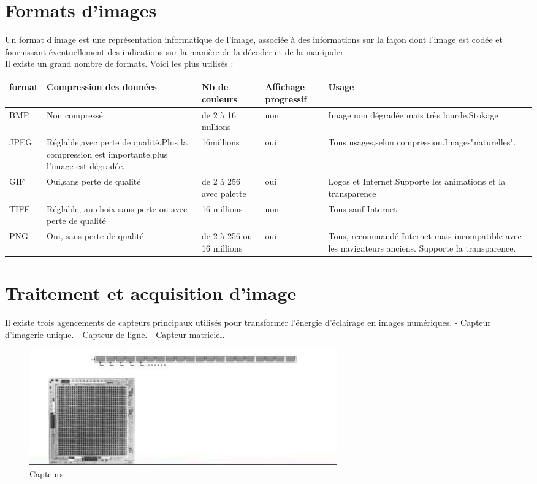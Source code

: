 \documentclass[12pt,a4paper]{report}
\numberwithin{equation}{subsection}
\numberwithin{equation}{section}
\begin{document}
\section{Formats d’images}
Un format d'image est une représentation informatique de l'image, associée à des
informations sur la façon dont l'image est codée et fournissant éventuellement des indications sur la
manière de la décoder et de la manipuler.
\\ 
Il existe un grand nombre de formats. Voici les plus utilisés :\\

\begin{tabular}{|p{1.5cm}|p{4cm}|p{2cm}|p{2cm}|p{4cm}|}
\hline
format & Compression des
données & Nb de
couleurs & Affichage
progressif & Usage \\
\hline
BMP & Non compressé & de 2 à 16
millions & non & Image non dégradée mais très lourde.Stokage \\
\hline
JPEG & Réglable,avec perte de qualité.Plus la compression est importante,plus l'image est dégradée. & 16millions & oui & Tous usages,selon compression.Images"naturelles".\\
\hline
GIF & Oui,sans perte de qualité & de 2 à 256 avec palette & oui & Logos et Internet.Supporte les animations et la transparence \\
\hline
TIFF & Réglable, au choix sans perte ou avec perte de qualité & 16 millions & non & Tous sauf Internet \\
\hline
PNG & Oui, sans perte de qualité & de 2 à 256 ou 16 millions & oui & Tous, recommandé Internet mais incompatible avec les navigateurs anciens. Supporte la transparence. \\
\hline
\end{tabular}
\newline
\newline



\newpage
\section{ Traitement et acquisition d'image}
 Il existe trois agencements de capteurs principaux utilisés pour transformer l'énergie d'éclairage en images numériques.  \newline- Capteur d'imagerie unique. \newline- Capteur de ligne. \newline- Capteur matriciel.
\begin{figure}[!h]
    \centering
    \begin{center}
        \includegraphics[height=5cm,width=10cm\textwidth]{capteur1.png}
    \end{center}
    \caption{Capteurs}
\end{figure}
\end{document}
